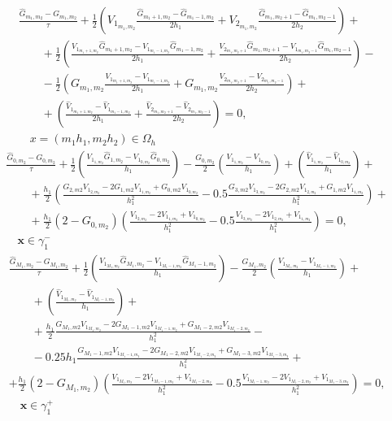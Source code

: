 \documentclass[a4paper]{article}
\theoremstyle{definition}
\numberwithin{equation}{section}
\begin{document}
\begin{eqnarray} \nonumber
& \frac{\hat{G}_{m_1,m_2} - G_{m_1,m_2}}{\tau} + \frac{1}{2} \left( V_{1_{m_1,m_2}} \frac{\hat{G}_{m_1+1,m_2} - \hat{G}_{m_1-1,m_2}}{2h_1} + V_{2_{m_1,m_2}} \frac{\hat{G}_{m_1,m_2+1} - \hat{G}_{m_1,m_2-1}}{2h_2} \right) + \\ \nonumber
& \qquad + \frac{1}{2} \left( \frac{V_{1_{m_1+1,m_2}}\hat{G}_{m_1+1,m_2} - V_{1_{m_1-1,m_2}}\hat{G}_{m_1-1,m_2}}{2h_1} + \frac{V_{2_{m_1,m_2+1}}\hat{G}_{m_1,m_2+1} - V_{1_{m_1,m_2-1}}\hat{G}_{m_1,m_2-1}}{2h_2}\right) - \\ \nonumber
& \qquad - \frac{1}{2}\left( G_{m_1,m_2}\frac{V_{1_{m_1+1,m_2}} - V_{1_{m_1-1,m_2}}}{2h_1} + G_{m_1,m_2}\frac{V_{2_{m_1,m_2+1}} - V_{2_{m_1,m_2-1}}}{2h_2} \right) + \\ 
& \qquad + \left( \frac{\hat{V}_{1_{m_1+1,m_2}} - \hat{V}_{1_{m_1-1,m_2}}}{2h_1} + \frac{\hat{V}_{2_{m_1,m_2+1}} - \hat{V}_{2_{m_1,m_2-1}}}{2h_2} \right) = 0, \\ \nonumber & \quad x=(m_1h_1,m_2h_2)\in \Omega_h
\end{eqnarray}
\begin{eqnarray} \nonumber
& \frac{\hat{G}_{0,m_2} - G_{0,m_2}}{\tau} +  \frac{1}{2} \left( \frac{V_{1_{1,m_2}}\hat{G}_{1,m_2} - V_{1_{0,m_2}}\hat{G}_{0,m_2}}{h_1}\right) - \frac{G_{0,m_2}}{2}\left( \frac{V_{1_{1,m_2}} - V_{1_{0,m_2}}}{h_1} \right) + \left( \frac{\hat{V}_{1_{1,m_2}} - \hat{V}_{1_{0,m_2}}}{h_1} \right) + \\ \nonumber
& \qquad + \frac{h_1}{2}\left( \frac{G_{2,m2}V_{1_{2,m_2}} - 2G_{1,m2}V_{1_{1,m_2}} + G_{0,m2}V_{1_{0,m_2}}}{h_1^2} - 0.5\frac{G_{3,m2}V_{1_{3,m_2}} - 2G_{2,m2}V_{1_{2,m_2}} + G_{1,m2}V_{1_{1,m_2}}}{h_1^2} \right) + \\ 
& \qquad + \frac{h_1}{2}(2-G_{0,m_2})\left( \frac{V_{1_{2,m_2}} - 2V_{1_{1,m_2}} + V_{1_{0,m_2}}}{h_1^2} - 0.5\frac{V_{1_{3,m_2}} - 2V_{1_{2,m_2}} + V_{1_{1,m_2}}}{h_1^2} \right)=0, \\ \nonumber
& \quad \textbf{x}\in\gamma_1^-
\end{eqnarray}
\begin{eqnarray} \nonumber
& \frac{\hat{G}_{M_1,m_2} - G_{M_1,m_2}}{\tau} +  \frac{1}{2} \left( \frac{V_{1_{M_1,m_2}}\hat{G}_{M_1,m_2} - V_{1_{M_1-1,m_2}}\hat{G}_{M_1-1,m_2}}{h_1} \right)  - \frac{G_{M_1,m_2}}{2}\left( \frac{V_{1_{M_1,m_2}} - V_{1_{M_1-1,m_2}}}{h_1}\right) + \\ 
& \qquad + \left( \frac{\hat{V}_{1_{M_1,m_2}} - \hat{V}_{1_{M_1-1,m_2}}}{h_1}\right) + \\ \nonumber
& \qquad + \frac{h_1}{2} \frac{G_{M_1,m2}V_{1_{M_1,m_2}} - 2G_{M_1-1,m2}V_{1_{M_1-1,m_2}} + G_{M_1-2,m2}V_{1_{M_1-2,m_2}}}{h_1^2} - \\ \nonumber
& \qquad - 0.25h_1\frac{G_{M_1-1,m2}V_{1_{M_1-1,m_2}} - 2G_{M_1-2,m2}V_{1_{M_1-2,m_2}} + G_{M_1-3,m2}V_{1_{M_1-3,m_2}}}{h_1^2}  + \\ \nonumber
& + \frac{h_1}{2}(2-G_{M_1,m_2})\left( \frac{V_{1_{M_1,m_2}} - 2V_{1_{M_1-1,m_2}} + V_{1_{M_1-2,m_2}}}{h_1^2} - 0.5\frac{V_{1_{M_1-1,m_2}} - 2V_{1_{M_1-2,m_2}} + V_{1_{M_1-3,m_2}}}{h_1^2} \right)=0, \\ \nonumber
& \quad \textbf{x}\in\gamma_1^+
\end{eqnarray}
\end{document}
